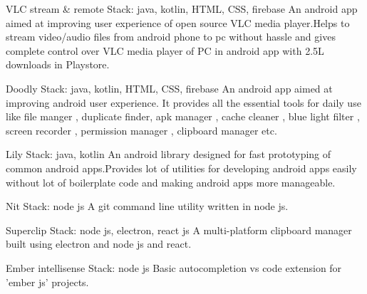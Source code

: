 
\begin{cventries}
  \cvproject
    {VLC stream \& remote} %
    {Stack: java, kotlin, HTML, CSS, firebase} %
    { \quad An android app aimed at improving user experience of open source VLC media player.Helps to stream video/audio files from android phone to pc without hassle and gives complete control over VLC media player of PC in android app with 2.5L downloads in Playstore.} %
  
  \cvproject
    {Doodly}
    {Stack: java, kotlin, HTML, CSS, firebase} %
    { \quad An android app aimed at improving android user experience. It provides all the essential tools for daily use like file manger , duplicate finder, apk manager , cache cleaner , blue light filter , screen recorder , permission manager , clipboard manager etc.}

  \cvproject
    {Lily}
    {Stack: java, kotlin} %
    { \quad An android library designed for fast prototyping of common android apps.Provides lot of utilities for developing android apps easily without lot of boilerplate code and making android apps more manageable.}

  \cvproject
    {Nit}
    {Stack: node js} %
    { \quad A git command line utility written in node js.}

  \cvproject
    {Superclip}
    {Stack: node js, electron, react js} %
    { \quad A multi-platform clipboard manager built using electron and node js and react.}
  
  \cvproject
    {Ember intellisense}
    {Stack: node js} %
    { \quad Basic autocompletion vs code extension for 'ember js' projects.}

\end{cventries}
